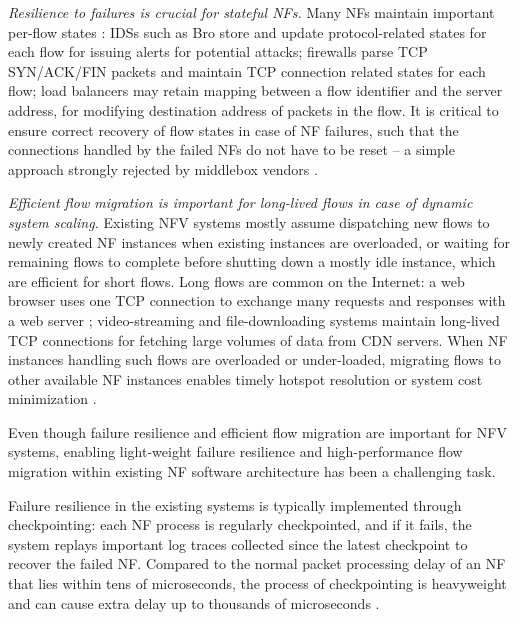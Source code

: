 
{\em Resilience to failures \cite{sherry2015rollback,rajagopalan2013pico} is crucial for stateful NFs.}  Many NFs maintain important per-flow states \cite{EnablingNF}: IDSs such as Bro \cite{bro} store and update protocol-related states for each flow for issuing alerts for potential attacks; firewalls \cite{firewall} parse TCP SYN/ACK/FIN packets and maintain TCP connection related states for each flow; load balancers \cite{lvs} may retain mapping between a flow identifier and the server address, for modifying destination address of packets in the flow. It is critical to ensure correct recovery of flow states in case of NF failures, such that the connections handled by the failed NFs do not have to be reset -- a simple approach strongly rejected by middlebox vendors \cite{sherry2015rollback}.

{\em Efficient flow migration \cite{rajagopalan2013split, gember2015opennf, qazi2017high} is important for long-lived flows in case of dynamic system scaling.} Existing NFV systems \cite{palkar2015e2, gember2012stratos} mostly assume dispatching new flows to newly created NF instances when existing instances are overloaded, or waiting for remaining flows to complete before shutting down a mostly idle instance, which are efficient for short flows. Long flows are common on the Internet:  a web browser uses one TCP connection to exchange many requests and responses with a web server \cite{http-keep-alive}; video-streaming \cite{ffmpeg} and file-downloading \cite{ftp} systems maintain long-lived TCP connections for fetching large volumes of data from CDN servers. When NF instances handling such flows are overloaded or under-loaded, migrating flows to other available NF instances enables timely hotspot resolution or system cost minimization \cite{gember2015opennf}.

Even though failure resilience and efficient flow migration are important for NFV systems, enabling light-weight failure resilience and high-performance flow migration within existing NF software architecture has been a challenging task.

Failure resilience in the existing systems \cite{sherry2015rollback,rajagopalan2013pico} is typically implemented through checkpointing: each NF process is regularly checkpointed, and if it fails, the system replays important log traces collected since the latest checkpoint to recover the failed NF. Compared to the normal packet processing delay of an NF that lies within tens of microseconds, the process of checkpointing is heavyweight and can cause extra delay up to thousands of microseconds \cite{sherry2015rollback, rajagopalan2013pico}.

